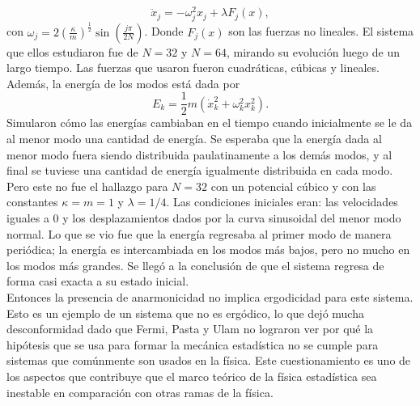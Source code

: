 \begin{equation}
\ddot{x}_{j}= - \omega_{j}^{2} x_{j} +\lambda F_{j}(x),
\end{equation}
con $\omega_{j} =2(\frac{\kappa }{m})^{\frac{1}{2}} \sin (\frac{j \pi}{2N})$. Donde $F_{j}(x)$ son las fuerzas no lineales. El sistema que ellos estudiaron fue de $N=32$ y $N=64$, mirando su evolución luego de un largo tiempo. Las fuerzas que usaron fueron cuadráticas, cúbicas y lineales. Además, la energía de los modos está dada por 
\begin{equation}
E_{k} = \frac{1}{2} m(\dot{x}^{2}_{k}+ \omega_{k}^{2}x_{k}^{2}).
\end{equation}
Simularon cómo las energías cambiaban en el tiempo cuando inicialmente se le da al menor modo una cantidad de energía. Se esperaba que la energía dada al menor modo fuera siendo distribuida paulatinamente a los demás modos, y al final se tuviese una cantidad de energía igualmente distribuida en cada modo. Pero este no fue el hallazgo para $N=32$ con un potencial cúbico y con las constantes $\kappa=m=1$ y $\lambda=1/4$. Las condiciones iniciales eran: las velocidades iguales a 0 y los desplazamientos dados por la curva sinusoidal del menor modo normal. Lo que se vio fue que la energía regresaba al primer modo de manera periódica; la energía es intercambiada en los modos más bajos, pero no mucho en los modos más grandes. Se llegó a la conclusión de que el sistema regresa de forma casi exacta a su estado inicial.  \\
Entonces la presencia de anarmonicidad no implica ergodicidad para este sistema. Esto es un ejemplo de un sistema que no es ergódico, lo que dejó mucha desconformidad dado que Fermi, Pasta y Ulam  no lograron  ver por qué la hipótesis que se usa para formar la mecánica estadística no se cumple para sistemas que comúnmente  son usados en la física. Este cuestionamiento es uno de los aspectos que contribuye que el marco teórico de la física estadística sea inestable en comparación con otras ramas de la física.



